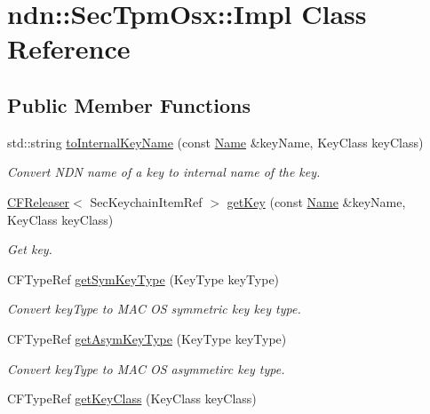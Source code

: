 \hypertarget{classndn_1_1SecTpmOsx_1_1Impl}{}\section{ndn\+:\+:Sec\+Tpm\+Osx\+:\+:Impl Class Reference}
\label{classndn_1_1SecTpmOsx_1_1Impl}
\subsection*{Public Member Functions}
\begin{DoxyCompactItemize}
\item 
std\+::string \hyperlink{classndn_1_1SecTpmOsx_1_1Impl_a4b743df2d64bef95194959e7987b2ab9}{to\+Internal\+Key\+Name} (const \hyperlink{classndn_1_1Name}{Name} \&key\+Name, Key\+Class key\+Class)
\begin{DoxyCompactList}\small\item\em Convert N\+DN name of a key to internal name of the key. \end{DoxyCompactList}\item 
\hyperlink{classndn_1_1CFReleaser}{C\+F\+Releaser}$<$ Sec\+Keychain\+Item\+Ref $>$ \hyperlink{classndn_1_1SecTpmOsx_1_1Impl_a44d2bd8f42079ed4852356fead0d998f}{get\+Key} (const \hyperlink{classndn_1_1Name}{Name} \&key\+Name, Key\+Class key\+Class)
\begin{DoxyCompactList}\small\item\em Get key. \end{DoxyCompactList}\item 
C\+F\+Type\+Ref \hyperlink{classndn_1_1SecTpmOsx_1_1Impl_a41f8056d1084dbeb4cc33d5c3209328b}{get\+Sym\+Key\+Type} (Key\+Type key\+Type)
\begin{DoxyCompactList}\small\item\em Convert key\+Type to M\+AC OS symmetric key key type. \end{DoxyCompactList}\item 
C\+F\+Type\+Ref \hyperlink{classndn_1_1SecTpmOsx_1_1Impl_a319b844cdbbd625a09fc17f90c760e5d}{get\+Asym\+Key\+Type} (Key\+Type key\+Type)
\begin{DoxyCompactList}\small\item\em Convert key\+Type to M\+AC OS asymmetirc key type. \end{DoxyCompactList}\item 
C\+F\+Type\+Ref \hyperlink{classndn_1_1SecTpmOsx_1_1Impl_a6ed271478d84fb445e28577c010efd25}{get\+Key\+Class} (Key\+Class key\+Class)

\end{DoxyCompactItemize}
